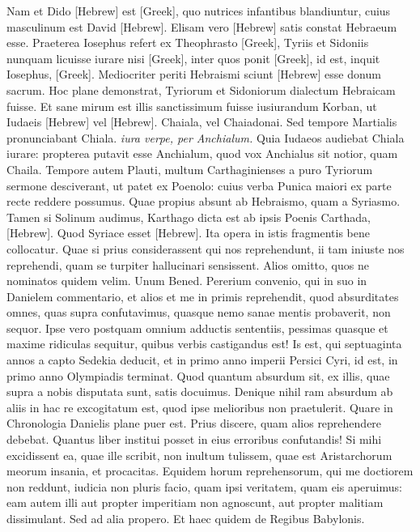 Nam et Dido \texthebrew{[Hebrew]} est \textgreek{[Greek]},
 quo nutrices
infantibus blandiuntur, cuius masculinum est David \texthebrew{[Hebrew]}.
Elisam
vero \texthebrew{[Hebrew]} satis constat Hebraeum esse.
Praeterea Iosephus refert
ex Theophrasto \textgreek{[Greek]}, Tyriis et Sidoniis nunquam licuisse
iurare nisi \textgreek{[Greek]},
 inter quos ponit \textgreek{[Greek]}, id est, inquit
Iosephus, \textgreek{[Greek]}.
Mediocriter periti Hebraismi sciunt \texthebrew{[Hebrew]} esse
donum sacrum.
Hoc plane demonstrat, Tyriorum et Sidoniorum
dialectum Hebraicam fuisse.
Et sane mirum est illis sanctissimum
fuisse iusiurandum Korban, ut Iudaeis
 \texthebrew{[Hebrew]} vel \texthebrew{[Hebrew]}.
Chaiala,
vel Chaiadonai.
Sed tempore Martialis pronunciabant Chiala.
\textit{iura verpe, per Anchialum.}
Quia Iudaeos audiebat Chiala iurare:
propterea putavit esse Anchialum, quod vox Anchialus sit notior,
quam Chaila.
Tempore autem Plauti, multum Carthaginienses
a puro Tyriorum sermone desciverant, ut patet ex Poenolo:
cuius verba Punica maiori ex parte recte reddere possumus.
Quae propius absunt ab Hebraismo, quam a Syriasmo.
Tamen
si Solinum audimus, Karthago dicta est ab ipsis Poenis Carthada,
\texthebrew{[Hebrew]}.
Quod Syriace esset \texthebrew{[Hebrew]}.
Ita opera in istis fragmentis
bene collocatur.
Quae si prius considerassent qui nos reprehendunt,
ii tam iniuste nos reprehendi, quam se turpiter hallucinari
sensissent.
Alios omitto, quos ne nominatos quidem velim.
Unum Bened.
Pererium convenio, qui in suo in Danielem commentario,
et alios et me in primis reprehendit, quod absurditates
omnes, quas supra confutavimus, quasque nemo sanae mentis
probaverit, non sequor.
Ipse vero postquam omnium adductis sententiis,
pessimas quasque et maxime ridiculas sequitur, quibus verbis
castigandus est!
Is est, qui septuaginta annos a capto Sedekia
deducit, et in primo anno imperii Persici Cyri, id est, in primo
anno Olympiadis  terminat.
Quod quantum absurdum sit, ex
illis, quae supra a nobis disputata sunt, satis docuimus.
Denique
nihil ram absurdum ab aliis in hac re excogitatum est, quod ipse
melioribus non praetulerit.
Quare in Chronologia Danielis plane
puer est.
Prius discere, quam alios reprehendere debebat.
Quantus liber institui posset in eius erroribus confutandis!
Si mihi excidissent
ea, quae ille scribit, non inultum tulissem, quae est Aristarchorum
meorum insania, et procacitas.
Equidem horum reprehensorum,
qui me doctiorem non reddunt, iudicia non pluris
facio, quam ipsi veritatem, quam eis aperuimus: eam autem illi aut
propter imperitiam non agnoscunt, aut propter malitiam dissimulant.
Sed ad alia propero.
Et haec quidem de Regibus Babylonis.

